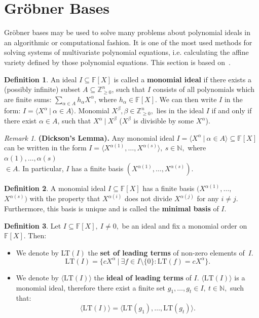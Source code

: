 \documentclass[thesis=M,english]{FITthesis}[2012/10/20]
\theoremstyle{remark}
\newtheorem*{RM}{Remark}
\theoremstyle{definition}
\newtheorem{DF}{Definition}[section]
\begin{document}
\section{Gröbner Bases}
Gröbner bases may be used to solve many problems about polynomial ideals in an algorithmic or computational fashion. It is one of the most used methods for solving systems of multivariate polynomial equations, i.e. calculating the affine variety defined by those polynomial equations. This section is based on~\cite{algGeom}.
\begin{DF}
An ideal $I \subseteq \mathbb{F}[X]$ is called a \textbf{monomial ideal} if there exists a (possibly infinite) subset $A \subseteq \mathbb{Z}_{\geq 0}^n$, such that $I$ consists of all polynomials which are finite sums: $\sum_{\alpha \in A} h_\alpha X^\alpha$, where $h_\alpha \in \mathbb{F}[X].$ We can then write $I$ in the form: $I = \langle X^\alpha \ |\ \alpha \in A\rangle.$ Monomial $X^\beta, \beta \in \mathbb{Z}_{\geq 0}^n,$ lies in the ideal $I$ if and only if there exist $\alpha \in A$, such that $X^\alpha \ |\ X^\beta$ ($X^\beta$ is divisible by some $X^\alpha$). 
\end{DF}
\begin{RM}
\textbf{(Dickson's Lemma).} Any monomial ideal ${I = \langle X^\alpha \ |\ \alpha \in A\rangle \subseteq \mathbb{F}[X]}$ can be written in the form $I = \langle X^{\alpha(1)}, \ldots, X^{\alpha(s)}\rangle,\ s \in \mathbb{N},$ where $\alpha(1), \ldots, \alpha(s)$\\ $\in A$. In particular, $I$ has a finite basis $(X^{\alpha(1)}, \ldots, X^{\alpha(s)})$.
\end{RM}
\begin{DF}
A monomial ideal $I \subseteq \mathbb{F}[X]$ has a finite basis $(X^{\alpha(1)}, \ldots, $\\$X^{\alpha(s)})$ with the property that $X^{\alpha(i)}$ does not divide $X^{\alpha(j)}$ for any $i \neq j$. Furthermore, this basis is unique and is called the \textbf{minimal basis} of $I$.
\end{DF}
\begin{DF}
Let $I \subseteq \mathbb{F}[X],\ I \neq {0},$ be an ideal and fix a monomial order on $\mathbb{F}[X]$.  Then:
\begin{itemize}
\item We denote by LT$(I)$ the \textbf{set of leading terms} of non-zero elements of~$I$.
$$
\text{LT}(I) = \{ cX^\alpha \ |\ \exists f \in I \setminus \{0\}: \text{LT}(f)= cX^\alpha \}.
$$
\item We denote by $\langle \text{LT}(I) \rangle$ the \textbf{ideal of leading terms} of $I$. $\langle \text{LT}(I) \rangle$ is a monomial ideal, therefore there exist a finite set $g_1,\ldots, g_t \in I,\ t \in \mathbb{N},$ such that:
$$
\langle \text{LT}(I) \rangle = \langle \text{LT}(g_1), \ldots, \text{LT}(g_t) \rangle.
$$
\end{itemize}
\end{DF}
\end{document}
